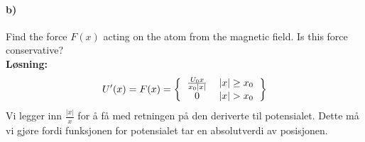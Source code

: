 \documentclass[11pt, A4paper,norsk]{article}
\begin{document}
		\paragraph{b)}
			\begin{flushleft}
Find the force $F(x)$ acting on the atom from the magnetic field. Is this force conservative? \\
\vspace{1mm}
\textbf{Løsning:}
\vspace{1mm}
					\begin{align}
U'(x) = F(x) = 
\left \{
\begin{tabular} { cc }
$\frac{U_0 x}{x_0 |x|}$ & $|x| \geq x_0$ \\
$0$ & $|x| > x_0$
\end{tabular} \right \} 
					\end{align}
Vi legger inn $\frac{|x|}{x}$ for å få med retningen på den deriverte til potensialet. Dette må vi gjøre fordi funksjonen for potensialet tar en absolutverdi av posisjonen.
			\end{flushleft}
\end{document}
